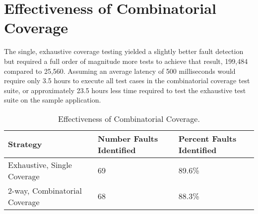 \section{Effectiveness of Combinatorial Coverage}

The single, exhaustive coverage testing yielded a slightly better fault detection but required a full order of magnitude more tests to achieve that result, 199,484 compared to 25,560.  Assuming an average latency of 500 milliseconds would require only 3.5 hours to execute all test cases in the combinatorial coverage test suite, or approximately 23.5 hours less time required to test the exhaustive test suite on the sample application.

\begin{table}[h]
	\centering
	\caption{Effectiveness of Combinatorial Coverage.}
	\begin{tabular}{| l | l | l |}
		\hline
  Strategy 						& 	Number Faults Identified		&	Percent Faults Identified			\\ \hline
  Exhaustive, Single	Coverage 		& 	69						&	89.6\%						\\ \hline
  2-way, Combinatorial Coverage& 	68						&	88.3\%						\\
		\hline
	\end{tabular}
\label{table:combinatorialEffectiveness}
\end{table}
